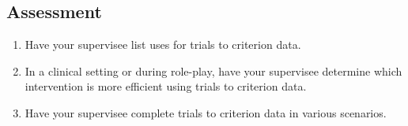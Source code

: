 \subsection{Assessment}
\begin{enumerate}
\item Have your supervisee list uses for trials to criterion data.
\item In a clinical setting or during role-play, have your supervisee determine which intervention is more efficient using trials to criterion data. 
\item Have your supervisee complete trials to criterion data in various scenarios. 
\end{enumerate}
%
